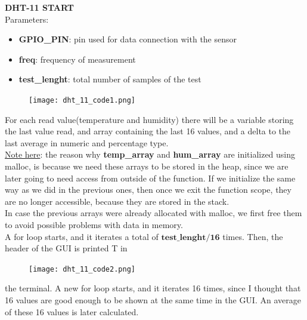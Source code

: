 \documentclass[14pt]{article}
\begin{document}
\begin{normalsize}
		\vspace{40pt}
		\noindent\large \textbf{DHT-11 START}\normalsize\\
		Parameters:
		\begin{itemize}
			\item \textbf{GPIO\_PIN}: pin used for data connection with the sensor
			\item \textbf{freq}: frequency of measurement
			\item \textbf{test\_lenght}: total number of samples of the test
		\end{itemize}
		\begin{figure}
			\begin{center}
				\texttt{[image: dht\_11\_code1.png]}
			\end{center}
		\end{figure}
		For each read value(temperature and humidity) there will be a variable storing the last value read, and array containing the last 16 values, and a delta to the last average in numeric and percentage type.\\
		
		\underline{Note here}: the reason why \textbf{temp\_array} and \textbf{hum\_array} are initialized using malloc, is because we need these arrays to be stored in the heap, since we are later going to need access from outside of the function. If we initialize the same way as we did in the previous ones, then once we exit the function scope, they are no longer accessible, because they are stored in the stack.\vspace{3pt}\\
		In case the previous arrays were already allocated with malloc, we first free them to avoid possible problems with data in memory.\\
		\newpage
		\noindent A for loop starts, and it iterates a total of $\boldsymbol{test\_lenght/16}$ times. Then, the header of the GUI is printed T in
				
		\setlength{\intextsep}{-10pt}
		\begin{figure}
			\begin{center}
				\texttt{[image: dht\_11\_code2.png]}
			\end{center}
		\end{figure}
		\noindent the terminal. A new for loop starts, and it iterates 16 times, since I thought that 16 values are good enough to be shown at the same time in the GUI. An average of these 16 values is later calculated.\\
		

\end{normalsize}
\end{document}
